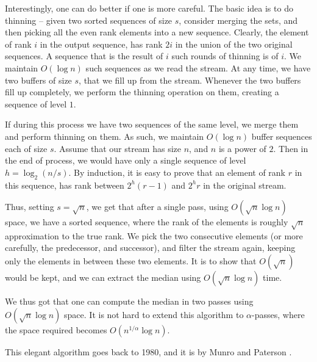 \begin{remark}
    Interestingly, one can do better if one is more careful. The basic
    idea is to do thinning -- given two sorted sequences of size $s$,
    consider merging the sets, and then picking all the even rank
    elements into a new sequence. Clearly, the element of rank $i$ in
    the output sequence, has rank $2i$ in the union of the two
    original sequences. A sequence that is the result of $i$ such
    rounds of thinning is of  $i$. We maintain
    $O( \log n)$ such sequences as we read the stream. At any time, we
    have two buffers of size $s$, that we fill up from the
    stream. Whenever the two buffers fill up completely, we perform
    the thinning operation on them, creating a sequence of level $1$.

    If during this process we have two sequences of the same level, we
    merge them and perform thinning on them. As such, we maintain
    $O( \log n)$ buffer sequences each of size $s$. Assume that our
    stream has size $n$, and $n$ is a power of $2$. Then in the end
    of process, we would have only a single sequence of level
    $h = \log_2(n/s)$. By induction, it is easy to prove that an
    element of rank $r$ in this sequence, has rank between $2^h (r-1)$
    and $2^hr$ in the original stream.


    Thus, setting $s=\sqrt{n}$, we get that after a single pass, using
    $O( \sqrt{n} \log n)$ space, we have a sorted sequence, where the
    rank of the elements is roughly $\sqrt{n}$ approximation to the
    true rank. We pick the two consecutive elements (or more
    carefully, the predecessor, and successor), and filter the stream
    again, keeping only the elements in between these two elements. It
    is to show that $O( \sqrt{n})$ would be kept, and we can extract
    the median using $O( \sqrt{n} \log n)$ time.


    We thus got that one can compute the median in two passes using
    $O(\sqrt{n} \log n)$ space. It is not hard to extend this
    algorithm to $\alpha$-passes, where the space required becomes
    $O(n^{1/\alpha} \log n)$.


    This elegant algorithm goes back to 1980, and it is by Munro and
    Paterson \cite{mp-ssls-80}.
\end{remark}



